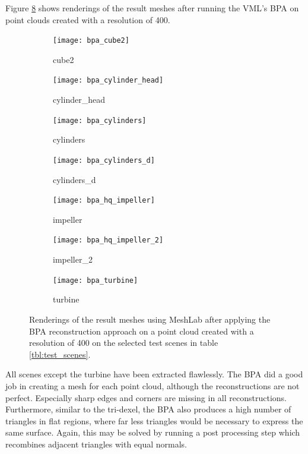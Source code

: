 Figure \ref{fig:bpa_results} shows renderings of the result meshes after running the VML's BPA on point clouds created with a resolution of 400.
%
\begin{figure}
	\centering
	\begin{subfigure}[b]{0.34\textwidth}
		\centering
		\texttt{[image: bpa\_cube2]}
		\caption{cube2}
		\label{fig:bpa_cube2}
	\end{subfigure}
	\hspace{1cm}
	\begin{subfigure}[b]{0.34\textwidth}
		\centering
		\texttt{[image: bpa\_cylinder\_head]}
		\caption{cylinder\_head}
		\label{fig:bpa_cylinder_head}
	\end{subfigure}
	\begin{subfigure}[b]{0.34\textwidth}
		\centering
		\texttt{[image: bpa\_cylinders]}
		\caption{cylinders}
		\label{fig:bpa_cylinders}
	\end{subfigure}
	\hspace{1cm}
	\begin{subfigure}[b]{0.34\textwidth}
		\centering
		\texttt{[image: bpa\_cylinders\_d]}
		\caption{cylinders\_d}
		\label{fig:bpa_cylinders_d}
	\end{subfigure}
	\begin{subfigure}[b]{0.34\textwidth}
		\centering
		\texttt{[image: bpa\_hq\_impeller]}
		\caption{impeller}
		\label{fig:bpa_hq_impeller}
	\end{subfigure}
	\hspace{1cm}
	\begin{subfigure}[b]{0.34\textwidth}
		\centering
		\texttt{[image: bpa\_hq\_impeller\_2]}
		\caption{impeller\_2}
		\label{fig:bpa_hq_impeller_2}
	\end{subfigure}
	\begin{subfigure}[b]{0.33\textwidth}
		\centering
		\texttt{[image: bpa\_turbine]}
		\caption{turbine}
		\label{fig:bpa_turbine}
	\end{subfigure}
	\caption{
		Renderings of the result meshes using MeshLab after applying the BPA reconstruction approach on a point cloud created with a resolution of 400 on the selected test scenes in table \ref{tbl:test_scenes}.
	}
	\label{fig:bpa_results}
\end{figure}
%
All scenes except the turbine have been extracted flawlessly.
The BPA did a good job in creating a mesh for each point cloud, although the reconstructions are not perfect.
Especially sharp edges and corners are missing in all reconstructions.
Furthermore, similar to the tri-dexel, the BPA also produces a high number of triangles in flat regions, where far less triangles would be necessary to express the same surface.
Again, this may be solved by running a post processing step which recombines adjacent triangles with equal normals.

